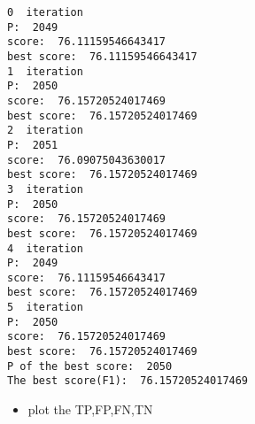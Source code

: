 \documentclass[11pt]{article}
\providecommand{\tightlist}{%
      \setlength{\itemsep}{0pt}\setlength{\parskip}{0pt}}
\begin{document}
    \begin{Verbatim}[commandchars=\\\{\}]
0  iteration
P:  2049
score:  76.11159546643417
best score:  76.11159546643417
1  iteration
P:  2050
score:  76.15720524017469
best score:  76.15720524017469
2  iteration
P:  2051
score:  76.09075043630017
best score:  76.15720524017469
3  iteration
P:  2050
score:  76.15720524017469
best score:  76.15720524017469
4  iteration
P:  2049
score:  76.11159546643417
best score:  76.15720524017469
5  iteration
P:  2050
score:  76.15720524017469
best score:  76.15720524017469
P of the best score:  2050
The best score(F1):  76.15720524017469

    \end{Verbatim}

    \begin{itemize}
\tightlist
\item
  plot the TP,FP,FN,TN
\end{itemize}
\end{document}
